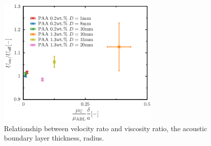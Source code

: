 \begin{figure}[ht]
    \centering
    \includegraphics[width=0.7\textwidth]{./5-Results/diameter-0.2-1.3/mu_Udiff.eps}
    \caption{Relationship between velocity rato and viscosity ratio, the acoustic boundary layer thickness, radius.}
    \label{fig:muUdiff0.2-1.3}
\end{figure}